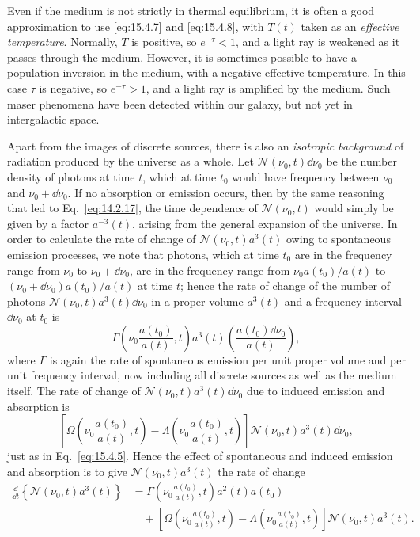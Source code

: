 Even if the medium is not strictly in thermal equilibrium, it is often a good
approximation to use \eqref{eq:15.4.7} and \eqref{eq:15.4.8}, with \(T(t)\)
taken as an \emph{effective temperature}. Normally, \(T\) is positive, so
\(e^{-\tau}<1\), and a light ray is weakened as it passes through the medium.
However, it is sometimes possible to have a population inversion in the
medium, with a negative effective temperature. In this case \(\tau\) is
negative, so \(e^{-\tau}>1\), and a light ray is amplified by the medium. Such
maser phenomena have been detected within our galaxy, but not yet in
intergalactic space.

Apart from the images of discrete sources, there is also an \emph{isotropic
background} of radiation produced by the universe as a whole. Let
\(\mathcal N(\nu_0,t)\dd\nu_0\) be the number density of photons at time \(t\),
which at time \(t_0\) would have frequency between \(\nu_0\) and
\(\nu_0+\dd\nu_0\). If no absorption or emission occurs, then by the same
reasoning that led to Eq.~\eqref{eq:14.2.17}, the time dependence of
\(\mathcal N(\nu_0,t)\) would simply be given by a factor \(a^{-3}(t)\),
arising from the general expansion of the universe. In order to calculate the
rate of change of \(\mathcal N(\nu_0,t)a^3(t)\) owing to spontaneous emission
processes, we note that photons, which at time \(t_0\) are in the frequency
range from \(\nu_0\) to \(\nu_0+\dd\nu_0\), are in the frequency range from
\(\nu_0a(t_0)/a(t)\) to
\((\nu_0+\dd\nu_0)a(t_0)/a(t)\) at time \(t\); hence the rate of change of
the number of photons \(\mathcal N(\nu_0,t)a^3(t)\dd\nu_0\) in a proper
volume \(a^3(t)\) and a frequency interval \(\dd\nu_0\) at \(t_0\) is
\[
  \Gamma\left(\nu_0\frac{a(t_0)}{a(t)},t\right)
  a^3(t)\left(\frac{a(t_0)\dd\nu_0}{a(t)}\right),
\]
where \(\Gamma\) is again the rate of spontaneous emission per unit proper
volume and per unit frequency interval, now including all discrete sources as
well as the medium itself. The rate of change of
\(\mathcal N(\nu_0,t)a^3(t)\dd\nu_0\) due to induced emission and absorption
is
\[
  \left[
    \Omega\left(\nu_0\frac{a(t_0)}{a(t)},t\right)
    -
    \Lambda\left(\nu_0\frac{a(t_0)}{a(t)},t\right)
  \right]
  \mathcal N(\nu_0,t)a^3(t)\dd\nu_0,
\]
just as in Eq.~\eqref{eq:15.4.5}. Hence the effect of spontaneous and induced
emission and absorption is to give \(\mathcal N(\nu_0,t)a^3(t)\) the rate of
change
\begin{align*}
  \frac{\dd}{\dd t}\left\{\mathcal N(\nu_0,t)a^3(t)\right\}
  &=
  \Gamma\left(\nu_0\frac{a(t_0)}{a(t)},t\right)a^2(t)a(t_0)
  \\
  &\quad+
  \left[
    \Omega\left(\nu_0\frac{a(t_0)}{a(t)},t\right)
    -
    \Lambda\left(\nu_0\frac{a(t_0)}{a(t)},t\right)
  \right]\mathcal N(\nu_0,t)a^3(t).
\end{align*}
